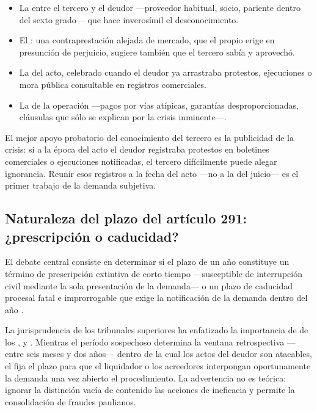 \begin{itemize}
  \item La  entre el tercero y el deudor ---proveedor habitual,
  socio, pariente dentro del sexto grado--- que hace inverosímil el desconocimiento.
  \item El : una contraprestación alejada de mercado, que el propio
   erige en presunción de perjuicio, sugiere también que el tercero sabía y aprovechó.
  \item La  del acto, celebrado cuando el deudor ya arrastraba protestos,
  ejecuciones o mora pública consultable en registros comerciales.
  \item La  de la operación ---pagos por vías atípicas, garantías
  desproporcionadas, cláusulas que sólo se explican por la crisis inminente---.
\end{itemize}

\begin{practica}
El mejor apoyo probatorio del conocimiento del tercero es la publicidad de la crisis: si a la
época del acto el deudor registraba protestos en boletines comerciales o ejecuciones
notificadas, el tercero difícilmente puede alegar ignorancia. Reunir esos registros a la fecha
del acto ---no a la del juicio--- es el primer trabajo de la demanda subjetiva.
\end{practica}

\bloqueJurisprudencial

\subsection{Naturaleza del plazo del artículo 291: ¿prescripción o caducidad?}

El debate central consiste en determinar si el plazo de un año constituye un término de
prescripción extintiva de corto tiempo ---susceptible de interrupción civil mediante la sola
presentación de la demanda--- o un plazo de caducidad procesal fatal e improrrogable que exige
la notificación de la demanda dentro del año \parencite{doc-plazos-revocatorias}.

La jurisprudencia de los tribunales superiores ha enfatizado la importancia de  de
los ,  y . Mientras el período sospechoso determina la ventana
retrospectiva ---entre seis meses y dos años--- dentro de la cual los actos del deudor son
atacables, el  fija el plazo para que el liquidador o los acreedores interpongan
oportunamente la demanda una vez abierto el procedimiento. La advertencia no es teórica:
ignorar la distinción vacía de contenido las acciones de ineficacia y permite la consolidación
de fraudes paulianos.


